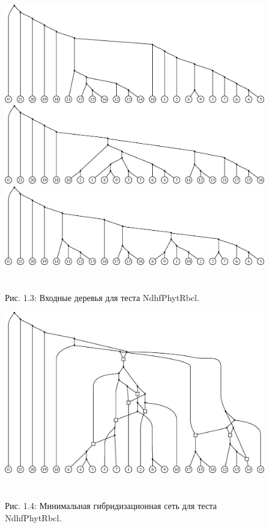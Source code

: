 \begin{figure}[h]
  \includegraphics[width=\linewidth]{img/Grass3NdhfPhytRbcl_tree0.eps}
  \includegraphics[width=\linewidth]{img/Grass3NdhfPhytRbcl_tree1.eps}
  \includegraphics[width=\linewidth]{img/Grass3NdhfPhytRbcl_tree2.eps}
  \\\\\\
  \centering
  Рис. 1.3: Входные деревья для теста NdhfPhytRbcl.
\end{figure}

\begin{figure}[h]
  \includegraphics[width=\linewidth]{img/Grass3NdhfPhytRbcl.eps}
  \\\\\\
  \centering
  Рис. 1.4: Минимальная гибридизационная сеть для теста NdhfPhytRbcl.
\end{figure}

